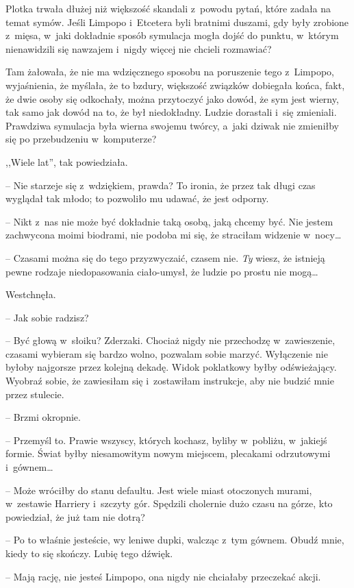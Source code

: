 \documentclass[oneside,polish,11pt,sfheadings]{mwbk}
\begin{document}
Plotka trwała dłużej niż większość skandali z~powodu pytań, które zadała
na temat symów. Jeśli Limpopo i~Etcetera byli bratnimi duszami, gdy były
zrobione z~mięsa, w~jaki dokładnie sposób symulacja mogła dojść do
punktu, w~którym nienawidzili się nawzajem i~nigdy więcej nie chcieli
rozmawiać?

Tam żałowała, że nie ma wdzięcznego sposobu na poruszenie tego z~Limpopo, wyjaśnienia, że myślała, że to bzdury, większość związków
dobiegała końca, fakt, że dwie osoby się odkochały, można przytoczyć
jako dowód, że sym jest wierny, tak samo jak dowód na to, że był
niedokładny. Ludzie dorastali i~się zmieniali. Prawdziwa symulacja była
wierna swojemu twórcy, a~jaki dziwak nie zmieniłby się po przebudzeniu w~komputerze?

,,Wiele lat'', tak powiedziała.

-- Nie starzeje się z~wdziękiem, prawda? To ironia, że przez tak długi
czas wyglądał tak młodo; to pozwoliło mu udawać, że jest odporny.

-- Nikt z~nas nie może być dokładnie taką osobą, jaką chcemy być. Nie
jestem zachwycona moimi biodrami, nie podoba mi się, że straciłam
widzenie w~nocy\ldots 

-- Czasami można się do tego przyzwyczaić, czasem nie. \textit{Ty} wiesz,
że istnieją pewne rodzaje niedopasowania ciało-umysł, że ludzie po
prostu nie mogą\ldots 

Westchnęła. 

-- Jak sobie radzisz?

-- Być głową w~słoiku? Zderzaki. Chociaż nigdy nie przechodzę w~zawieszenie, czasami wybieram się bardzo wolno, pozwalam sobie marzyć.
Wyłączenie nie byłoby najgorsze przez kolejną dekadę. Widok poklatkowy
byłby odświeżający. Wyobraź sobie, że zawiesiłam się i~zostawiłam
instrukcje, aby nie budzić mnie przez stulecie.

-- Brzmi okropnie.

-- Przemyśl to. Prawie wszyscy, których kochasz, byliby w~pobliżu, w~jakiejś formie. Świat byłby niesamowitym nowym miejscem, plecakami
odrzutowymi i~gównem\ldots 

-- Może wróciłby do stanu defaultu. Jest wiele miast otoczonych murami, w~zestawie Harriery i~szczyty gór. Spędzili cholernie dużo czasu na górze,
kto powiedział, że już tam nie dotrą?

-- Po to właśnie jesteście, wy leniwe dupki, walcząc z~tym gównem. Obudź
mnie, kiedy to się skończy. Lubię tego dźwięk.

-- Mają rację, nie jesteś Limpopo, ona nigdy nie chciałaby przeczekać
akcji.
\end{document}
